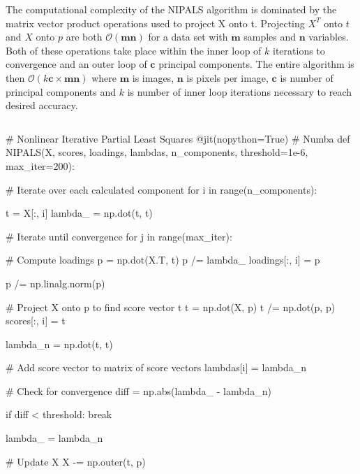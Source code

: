 \documentclass[12pt]{article}
\begin{document}
The computational complexity of the NIPALS algorithm is dominated by the matrix vector product operations used to project X onto t. Projecting $X^T$ onto $t$ and $X$ onto $p$ are both $\mathcal{O}(\textbf{mn})$ for a data set with $\textbf{m}$ samples and $\textbf{n}$ variables. Both of these operations take place within the inner loop of $k$ iterations to convergence and an outer loop of $\textbf{c}$ principal components. The entire algorithm is then $\mathcal{O}(k\textbf{c}\times\textbf{mn})$ where $\textbf{m}$ is images, $\textbf{n}$ is pixels per image, $\textbf{c}$ is number of principal components and $k$ is number of inner loop iterations necessary to reach desired accuracy.  
\pagebreak
\begin{lstlisting}[frame=none,caption={NIPALS Algorithm},captionpos=b,label=lst:NIPALS]
\end{lstlisting}
\begin{python}
# Nonlinear Iterative Partial Least Squares 
@jit(nopython=True) # Numba
def NIPALS(X, scores, loadings, lambdas, n_components, 
            threshold=1e-6, max_iter=200):

    # Iterate over each calculated component
    for i in range(n_components):

        t = X[:, i]
        lambda_ = np.dot(t, t) 

        # Iterate until convergence
        for j in range(max_iter):

            # Compute loadings
            p = np.dot(X.T, t)
            p /= lambda_
            loadings[:, i] = p

            p /= np.linalg.norm(p)
    
            # Project X onto p to find score vector t
            t = np.dot(X, p)
            t /= np.dot(p, p)
            scores[:, i] = t
      
            lambda_n = np.dot(t, t)

            # Add score vector to matrix of score vectors
            lambdas[i] = lambda_n

            # Check for convergence
            diff = np.abs(lambda_ - lambda_n)

            if diff < threshold:
                break

            lambda_ = lambda_n
           
        # Update X
        X -= np.outer(t, p) 
\end{python}


\end{document}
